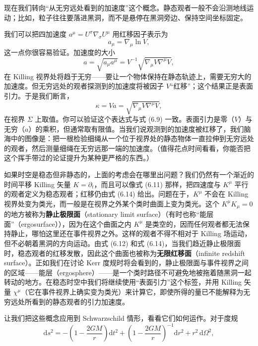 现在我们转向“从无穷远处看到的加速度”这个概念。静态观者一般不会沿测地线运动；比如，粒子往往要落进黑洞，而不是悬停在黑洞旁边、保持空间坐标固定。

我们可以把四加速度 $a^{\mu}=U^{\sigma}\nabla_{\sigma}U^{\mu}$ 用红移因子表示为
\begin{equation*}
a_\mu = \nabla_\mu\ln V,
\tag{6.15}
\end{equation*}
这一点你很容易验证。加速度的大小
\begin{equation*}
a = \sqrt{a_\mu a^\mu} = V^{-1}\sqrt{\nabla_\mu V\nabla^\mu V},
\tag{6.16}
\end{equation*}
在 Killing 视界处将趋于无穷——要让一个物体保持在静态轨迹上，需要无穷大的加速度。但无穷远处的观者探测到的加速度将被因子 $V$“红移”；这个结果正是表面引力。于是我们断言，
\begin{equation*}
\kappa = Va = \sqrt{\nabla_\mu V\nabla^\mu V},
\tag{6.17}
\end{equation*}
在视界 $\Sigma$ 上取值。你可以验证这个表达式与式 (6.9) 一致。表面引力是零（$V$）与无穷（$a$）的乘积，但通常取有限值。当我们说观测到的加速度被红移了，我们脑海中的图像是：把一根检验细绳从一个位于视界处的静态物体一直拉伸到无穷远处的观者，然后测量细绳在无穷远那一端的加速度。（值得花点时间看看，你能否把这个挥手带过的论证提升为某种更严格的东西。）

如果时空是稳态但非静态的，上面的考虑会在哪里出问题？我们仍然有一个渐近的时间平移 Killing 矢量 $K=\partial_t$，而且可以像式 (6.11) 那样，把四速度与 $K^{\mu}$ 平行的观者定义为稳态观者；红移仍由式 (6.14) 给出。问题在于，$K^{\mu}$ 不会在 Killing 视界处变为类光，而一般是在视界之外某个类时曲面上变为类光。这个 $K^{\mu}K_\mu=0$ 的地方被称为\textbf{静止极限面}（stationary limit surface）（有时也称“能层面”（ergosurface）），因为在这个曲面之内 $K^{\mu}$ 是类空的，因而任何观者都无法保持静止，哪怕这里还在事件视界之外。这样的观者不得不相对于 Killing 场运动，但不必朝着黑洞的方向运动。由式 (6.12) 和式 (6.14)，当我们趋近静止极限面时，稳态观者的红移发散，因此这个曲面也被称为\textbf{无限红移面}（infinite redshift surface）。正如我们在讨论 Kerr 度规时将会看到的，静止极限面与事件视界之间的区域——能层（ergosphere）——是一个类时路径不可避免地被拖着随黑洞一起转动的地方。在稳态时空中我们将继续使用“表面引力”这个标签，并用 Killing 矢量 $\chi^{\mu}$（它在事件视界上确实变为类光）来计算它，即使所得的量已不能解释为无穷远处所看到的静态观者的引力加速度。

让我们把这些概念应用到 Schwarzschild 情形，看看它们如何运作。对于度规
\begin{equation*}
\mathrm{d}s^{2} = -\left(1-\frac{2GM}{r}\right)\mathrm{d}t^{2} + \left(1-\frac{2GM}{r}\right)^{-1}\mathrm{d}r^{2} + r^{2}\,\mathrm{d}\Omega^{2},
\tag{6.18}
\end{equation*}

